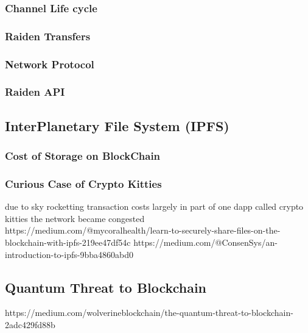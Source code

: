 \subsubsection{Channel Life cycle}
\subsubsection{Raiden Transfers}
\subsubsection{Network Protocol}
\subsubsection{Raiden API}

\subsection{InterPlanetary File System (IPFS)}
\subsubsection{Cost of Storage on BlockChain}
\subsubsection{Curious Case of Crypto Kitties}
due to sky rocketting transaction costs largely in part of one dapp called crypto kitties the network became congested
https://medium.com/@mycoralhealth/learn-to-securely-share-files-on-the-blockchain-with-ipfs-219ee47df54c
https://medium.com/@ConsenSys/an-introduction-to-ipfs-9bba4860abd0
\subsection{Quantum Threat to Blockchain}
https://medium.com/wolverineblockchain/the-quantum-threat-to-blockchain-2adc429fd88b
